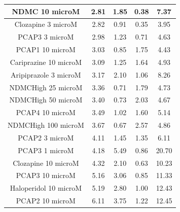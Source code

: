\documentclass[a4paper,12pt]{article}
\begin{document}
\begin{table}[h!]
\begin{tabular}{|c|c|c|c|c|}
NDMC 10 microM         & 2.81 & 1.85 & 0.38 & 7.37  \\ \hline
Clozapine 3 microM     & 2.82 & 0.91 & 0.35 & 3.95  \\ \hline
PCAP3 3 microM       & 2.98 & 1.23 & 0.71 & 4.63  \\ \hline
PCAP1 10 microM        & 3.03 & 0.85 & 1.75 & 4.43  \\ \hline
Cariprazine 10 microM  & 3.09 & 1.25 & 1.64 & 4.93  \\ \hline
Aripiprazole 3 microM  & 3.17 & 2.10  & 1.06 & 8.26  \\ \hline
NDMCHigh 25 microM     & 3.36 & 0.71 & 1.79 & 4.73  \\ \hline
NDMCHigh 50 microM     & 3.40  & 0.73 & 2.03 & 4.67  \\ \hline
PCAP4 10 microM      & 3.49 & 1.02 & 1.60  & 5.14  \\ \hline
NDMCHigh 100 microM    & 3.67 & 0.67 & 2.57 & 4.86  \\ \hline
PCAP2 3 microM         & 4.11 & 1.45 & 1.35 & 6.11  \\ \hline
PCAP3 1 microM       & 4.18 & 5.49 & 0.86 & 20.70  \\ \hline
Clozapine 10 microM    & 4.32 & 2.10  & 0.63 & 10.23 \\ \hline
PCAP3 10 microM      & 5.16 & 3.06 & 0.85 & 11.33 \\ \hline
Haloperidol 10 microM  & 5.19 & 2.80  & 1.00    & 12.43 \\ \hline
PCAP2 10 microM        & 6.11 & 3.75 & 1.22 & 12.45 \\ \hline
\end{tabular}
\end{table}
\newpage
\end{document}

